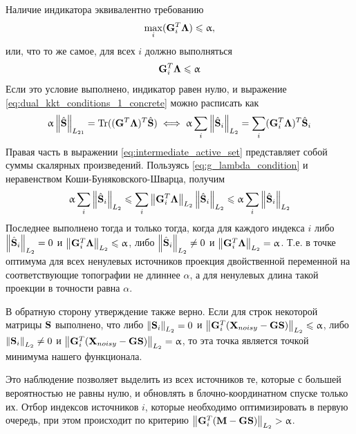 Наличие индикатора эквивалентно требованию
\[\max_{i}(\mathbf{G}^T_i\mathbf{\Lambda})\leqslant\upalpha,\]
или, что то же самое, для всех $i$ должно выполняться
\begin{equation}
    \mathbf{G}^T_i\mathbf{\Lambda}\leqslant\upalpha
    \label{eq:g_lambda_condition}
\end{equation}
Если это условие выполнено, индикатор равен нулю, и выражение
\ref{eq:dual_kkt_conditions_1_concrete} можно расписать как
\begin{equation}
    \upalpha \left\lVert\hat{\mathbf{S}}\right\rVert_{L_{21}} =
    \operatorname*{Tr}((\mathbf{G}^T\mathbf{\Lambda})^T\hat{\mathbf{S}}) \iff
    \upalpha \sum_i \left\lVert\hat{\mathbf{S}}_i\right\rVert_{L_2} =
    \sum_i (\mathbf{G}^T_i\mathbf{\Lambda})^T\hat{\mathbf{S}}_i
    \label{eq:intermediate_active_set}
\end{equation}
Правая часть в выражении \ref{eq:intermediate_active_set} представляет собой суммы скалярных
произведений.
Пользуясь \ref{eq:g_lambda_condition} и неравенством Коши-Буняковского-Шварца,
получим
\begin{equation}
   \upalpha \sum_i \left\lVert\hat{\mathbf{S}}_i\right\rVert_{L_2} \leqslant
   \sum_i \left\lVert\mathbf{G}^T_i\mathbf{\Lambda}\right\rVert_{L_2}\left\lVert\hat{\mathbf{S}}_i\right\rVert_{L_2} \leqslant
   \upalpha \sum_i \left\lVert\hat{\mathbf{S}}_i\right\rVert_{L_2}
\end{equation}
Последнее выполнено тогда и только тогда, когда для каждого индекса $i$
либо $\left\lVert\hat{\mathbf{S}}_i\right\rVert_{L_2} = 0$ и $\left\lVert\mathbf{G}^T_i\mathbf{\Lambda}\right\rVert_{L_2} \leqslant \upalpha$,
либо $\left\lVert\hat{\mathbf{S}}_i\right\rVert_{L_2} \neq 0$ и $\left\lVert\mathbf{G}^T_i\mathbf{\Lambda}\right\rVert_{L_2} = \upalpha$.
Т.е. в точке оптимума для всех ненулевых источников проекция двойственной переменной на соответствующие
топографии не длиннее $\alpha$, а для ненулевых длина такой проекции в точности равна $\alpha$.

В обратную сторону утверждение также верно. Если для строк некоторой матрицы $\mathbf{S}$ выполнено, что
либо $\left\lVert\mathbf{S}_i\right\rVert_{L_2} = 0$ и $\left\lVert\mathbf{G}^T_i(\mathbf{X} _{noisy}- \mathbf{GS})\right\rVert_{L_2} \leqslant \upalpha$,
либо $\left\lVert\mathbf{S}_i\right\rVert_{L_2} \neq 0$ и $\left\lVert\mathbf{G}^T_i(\mathbf{X}_{noisy} - \mathbf{GS})\right\rVert_{L_2} = \upalpha$,
то эта точка является точкой минимума нашего функционала.

Это наблюдение позволяет выделить из всех источников те, которые с большей вероятностью не равны нулю,
и обновлять в блочно-координатном спуске только их. Отбор индексов источников $i$, которые необходимо
оптимизировать в первую очередь, при этом происходит
по критерию $\left\lVert\mathbf{G}_i^T(\mathbf{M} - \mathbf{G}\mathbf{S})\right\rVert_{L_2} > \upalpha$.

